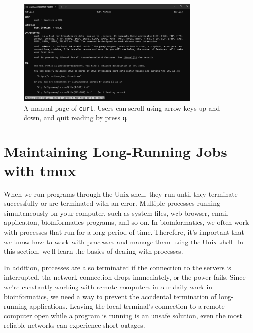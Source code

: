 \documentclass[
  letterpaper,
  DIV=11,
  numbers=noendperiod]{scrreprt}
\begin{document}
\begin{figure}

{\centering \includegraphics[width=0.8\textwidth,height=\textheight]{./assets/18_man_curl.png}

}

\caption{A manual page of \texttt{curl}. Users can scroll using arrow
keys up and down, and quit reading by press \texttt{q}.}

\end{figure}

\hypertarget{maintaining-long-running-jobs-with-tmux}{%
\section{Maintaining Long-Running Jobs with
tmux}\label{maintaining-long-running-jobs-with-tmux}}

When we run programs through the Unix shell, they run until they
terminate successfully or are terminated with an error. Multiple
processes running simultaneously on your computer, such as system files,
web browser, email application, bioinformatics programs, and so on. In
bioinformatics, we often work with processes that run for a long period
of time. Therefore, it's important that we know how to work with
processes and manage them using the Unix shell. In this section, we'll
learn the basics of dealing with processes.

In addition, processes are also terminated if the connection to the
servers is interrupted, the network connection drops immediately, or the
power fails. Since we're constantly working with remote computers in our
daily work in bioinformatics, we need a way to prevent the accidental
termination of long-running applications. Leaving the local terminal's
connection to a remote computer open while a program is running is an
unsafe solution, even the most reliable networks can experience short
outages.
\end{document}
